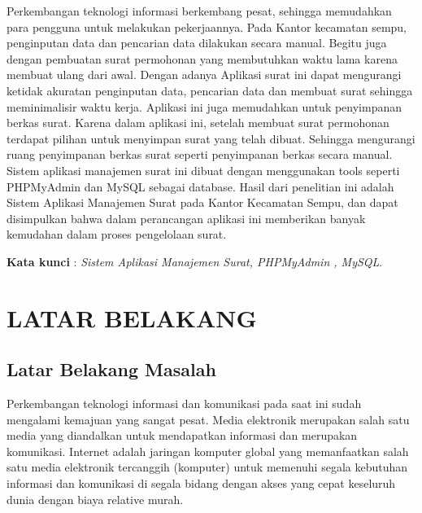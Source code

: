 \documentclass{jtetiproposalskripsi}
\begin{document}
\cover

\approvalpage


\begin{abstractind}
Perkembangan teknologi informasi berkembang pesat, sehingga memudahkan para pengguna untuk melakukan pekerjaannya. Pada Kantor kecamatan sempu, penginputan data dan pencarian data dilakukan secara manual. Begitu juga dengan pembuatan surat permohonan yang membutuhkan waktu lama karena membuat ulang dari awal.  Dengan adanya Aplikasi surat ini dapat mengurangi ketidak akuratan penginputan data, pencarian data dan membuat surat sehingga meminimalisir waktu kerja.  Aplikasi ini juga memudahkan untuk penyimpanan berkas surat. Karena dalam aplikasi ini, setelah membuat surat permohonan terdapat pilihan untuk menyimpan surat yang telah dibuat. Sehingga mengurangi ruang penyimpanan berkas surat seperti penyimpanan berkas secara manual.  Sistem aplikasi manajemen surat ini dibuat dengan menggunakan tools seperti PHPMyAdmin dan MySQL sebagai database. Hasil dari penelitian ini adalah Sistem Aplikasi Manajemen Surat pada Kantor Kecamatan Sempu, dan dapat disimpulkan bahwa dalam perancangan aplikasi ini memberikan banyak kemudahan dalam proses pengelolaan surat. 

\bigskip
\textbf{Kata kunci} : \emph{Sistem Aplikasi Manajemen Surat, PHPMyAdmin , MySQL}.
\end{abstractind}

\tableofcontents
{}
\clearpage{}\setcounter{page}{1}

\chapter{LATAR BELAKANG}

\section{Latar Belakang Masalah}
Perkembangan teknologi informasi dan komunikasi pada saat ini sudah mengalami kemajuan yang sangat pesat. Media elektronik merupakan salah satu media yang diandalkan untuk mendapatkan informasi dan merupakan komunikasi. Internet adalah jaringan komputer global yang memanfaatkan salah satu media elektronik tercanggih (komputer) untuk memenuhi segala kebutuhan informasi dan komunikasi di segala bidang dengan akses yang cepat keseluruh dunia dengan biaya relative murah.
\end{document}
